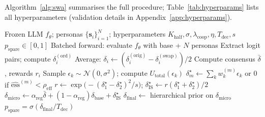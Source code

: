 \documentclass{article}
\begin{document}
Algorithm~\ref{alg:swa} summarises the full procedure; Table~\ref{tab:hyperparams}
lists all hyperparameters (validation details in Appendix~\ref{app:hyperparams}).

\begin{algorithm}[t]
\caption{SWA-DPBR Inference for Scenario $\mathbf{x}$ in Country $c$}
\label{alg:swa}
\begin{algorithmic}[1]
\Require Frozen LLM $f_\theta$; personas $\{\mathbf{s}_i\}_{i=1}^{N}$;
         hyperparameters $K_{\text{half}},\sigma,\lambda_{\text{coop}},\eta,T_{\text{dec}},s$
\Ensure $p_{\text{spare}} \in [0,1]$
  \State Batched forward: evaluate $f_\theta$ with base + $N$ personas
  \State Extract logit pairs; compute $\delta_i^{(\text{ord})}$ \hfill{}
\EndFor
\State Average: $\delta_i \leftarrow (\delta_i^{(\text{orig})} - \delta_i^{(\text{swap})})/2$ \hfill\Comment{\S\ref{sec:method:debias}}
\State Compute consensus $\bar{\delta}$, rewards $r_i$ \hfill{}
    \State Sample $\epsilon_k \sim \mathcal{N}(0, \sigma^2)$; compute $U_{\text{total}}(\epsilon_k)$ \hfill{}
  \EndFor
  \State $\delta^{\star}_m \leftarrow \sum_k w_k^{(m)} \epsilon_k$ or $0$ if $\widehat{\mathrm{ess}}^{(m)}<\rho_{\mathrm{eff}}$ \hfill{}
\EndFor
\State $r \leftarrow \exp\bigl(-(\delta^{\star}_1-\delta^{\star}_2)^2/s\bigr)$;
       $\delta^{\star}_{\mathrm{IS}} \leftarrow r(\delta^{\star}_1+\delta^{\star}_2)/2$ \hfill{}
\State $\delta_{\mathrm{micro}} \leftarrow \alpha_{\mathrm{reg}}\bar{\delta} + (1-\alpha_{\mathrm{reg}})\delta_{\text{base}} + \delta^{\star}_{\mathrm{IS}}$ \hfill{}
\State $\delta_{\text{final}} \leftarrow$ hierarchical prior on $\delta_{\mathrm{micro}}$
\State \Return $p_{\text{spare}} = \sigma(\delta_{\text{final}} / T_{\text{dec}})$
\end{algorithmic}
\end{algorithm}
\end{document}
